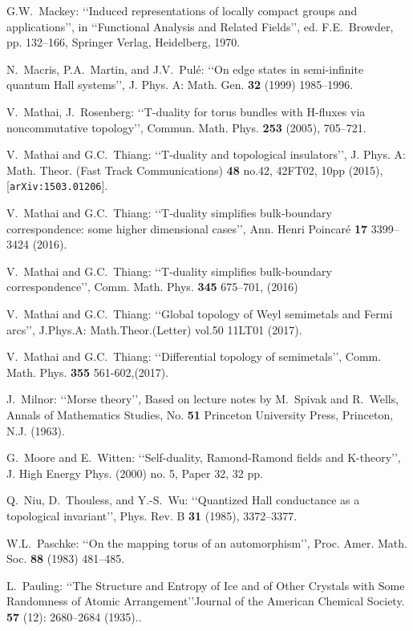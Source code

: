\documentclass[11pt]{article}
\begin{document}
\begin{thebibliography}{99}
G.W.\ Mackey: \lq\lq Induced representations of locally compact groups and applications\rq\rq,  in \lq\lq Functional Analysis and Related Fields\rq\rq, ed. F.E.\ Browder, pp. 132--166, Springer Verlag, Heidelberg, 1970.

N.\ Macris, P.A.\   Martin,  and J.V.\ Pul\'e: \lq\lq On edge states in semi-infinite quantum Hall systems\rq\rq,
J. Phys. A: Math. Gen. {\bf 32} (1999) 1985–1996. 

V.\ Mathai, J.\  Rosenberg: \lq\lq T-duality for torus bundles with H-fluxes via noncommutative topology\rq\rq, Commun. Math. Phys. {\bf 253}  (2005), 705--721. 

V.\ Mathai and G.C.\  Thiang: \lq\lq T-duality and topological insulators\rq\rq, J. Phys. A: Math. Theor. (Fast Track Communications) {\bf 48} no.42, 42FT02, 10pp  (2015), [{\tt arXiv:1503.01206}].

 V.\ Mathai and G.C.\  Thiang: \lq\lq T-duality simplifies bulk-boundary correspondence: some higher dimensional cases\rq\rq, Ann. Henri Poincar\'e {\bf 17}  3399--3424 (2016). 

V.\ Mathai and G.C.\  Thiang: \lq\lq T-duality simplifies bulk-boundary correspondence\rq\rq, Comm. Math. Phys. {\bf 345}  675--701, (2016)

V.\ Mathai and G.C.\  Thiang: \lq\lq Global topology of Weyl semimetals and Fermi arcs\rq\rq,  J.Phys.A: Math.Theor.(Letter) vol.50 11LT01 (2017). 

V.\ Mathai and G.C.\  Thiang: \lq\lq Differential topology of semimetals\rq\rq, Comm. Math. Phys. {\bf 355} 561-602,(2017).

J.\ Milnor: \lq\lq Morse theory\rq\rq, Based on lecture notes by M.\  Spivak and R.\  Wells,  Annals of Mathematics Studies, No. {\bf 51} Princeton University Press, Princeton, N.J. (1963). 

G.\ Moore and E.\ Witten: \lq\lq Self-duality, Ramond-Ramond fields and K-theory\rq\rq, J. High Energy Phys. (2000) no. 5, Paper 32, 32 pp.

Q.\  Niu, D.\  Thouless, and Y.-S.\  Wu: \lq\lq Quantized Hall conductance as a topological invariant\rq\rq, Phys. Rev. B {\bf 31} (1985), 3372--3377.

W.L.\ Paschke: \lq\lq On the mapping torus of an automorphism\rq\rq, Proc. Amer. Math. Soc. {\bf 88} (1983) 481--485.

 L.\ Pauling:  \lq\lq The Structure and Entropy of Ice and of Other Crystals with Some Randomness of Atomic Arrangement\rq\rq  Journal of the American Chemical Society. {\bf 57} (12): 2680--2684 (1935).. 


\end{thebibliography}
\end{document}
